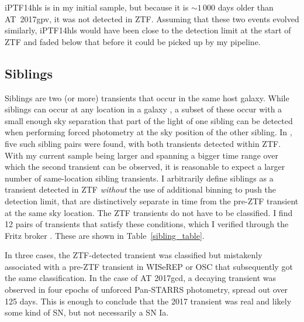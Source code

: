 \documentclass[a4paper,oneside,12pt, class=Latex/Classes/PhDthesisPSnPDF, crop=false]{standalone}
\begin{document}
iPTF14hls is in my initial sample, but because it is $\sim1\,000$ days older than AT~2017gpv, it was not detected in ZTF. Assuming that these two events evolved similarly, iPTF14hls would have been close to the detection limit at the start of ZTF and faded below that before it could be picked up by my pipeline.


\subsection{Siblings}
\label{siblings}
Siblings are two (or more) transients that occur in the same host galaxy. While siblings can occur at any location in a galaxy \citep[see e.g.][for a sample of ZTF-detected siblings]{BTS_siblings, DR2_siblings}, a subset of these occur with a small enough sky separation that part of the light of one sibling can be detected when performing forced photometry at the sky position of the other sibling. In \citet{Terwel_2024_paper1}, five such sibling pairs were found, with both transients detected within ZTF. With my current sample being larger and spanning a bigger time range over which the second transient can be observed, it is reasonable to expect a larger number of same-location sibling transients. I arbitrarily define siblings as a transient detected in ZTF \textit{without} the use of additional binning to push the detection limit, that are distinctively separate in time from the pre-ZTF transient at the same sky location. The ZTF transients do not have to be classified. I find 12 pairs of transients that satisfy these conditions, which I verified through the Fritz broker \cite{skyportal2019, Skyportal}. These are shown in Table~\ref{sibling_table}. 

In three cases, the ZTF-detected transient was classified but mistakenly associated with a pre-ZTF transient in WISeREP or OSC that subsequently got the same classification. In the case of AT 2017gcd, a decaying transient was observed in four epochs of unforced Pan-STARRS photometry, spread out over 125 days. This is enough to conclude that the 2017 transient was real and likely some kind of SN, but not necessarily a SN Ia.
\end{document}
